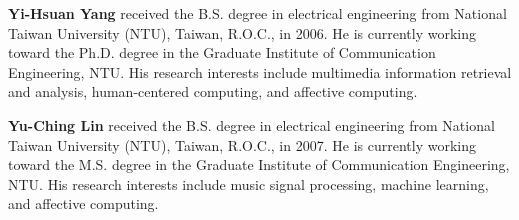 \documentclass[journal, twoside]{IEEEtran}
\begin{document}
% 

\begin{IEEEbiography}{\bf Yi-Hsuan Yang}
received the B.S. degree in electrical engineering from National Taiwan University
(NTU), Taiwan, R.O.C., in 2006. He is currently
working toward the Ph.D. degree in the Graduate
Institute of Communication Engineering, NTU.
His research interests include multimedia information retrieval and analysis, human-centered
computing, and affective computing.
\end{IEEEbiography}

\begin{IEEEbiography}{\bf Yu-Ching Lin}
received the B.S. degree in electrical engineering from National Taiwan University
(NTU), Taiwan, R.O.C., in 2007. He is currently
working toward the M.S. degree in the Graduate
Institute of Communication Engineering, NTU.
His research interests include music signal processing, machine learning, and affective computing.
\end{IEEEbiography}
\end{document}
